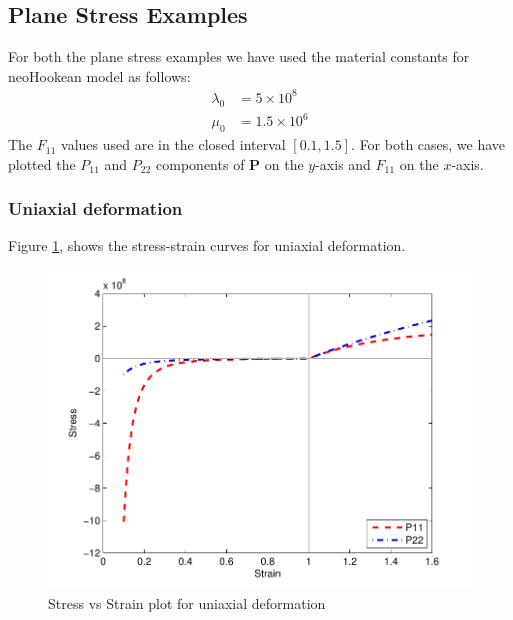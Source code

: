 \documentclass[../main.tex]{subfiles}
\begin{document}
\subsection{Plane Stress Examples}

For both the plane stress examples we have used the material constants for neoHookean model as follows:
\begin{align*}
  \lambda_0 &= 5\times10^8\\
  \mu_0 & = 1.5\times10^6
\end{align*}
The $F_{11}$ values used are in the closed interval $[0.1,1.5]$. For both cases, we have plotted the $P_{11}$ and $P_{22}$ components of $\mathbf{P}$ on the $y$-axis and $F_{11}$ on the $x$-axis.

\subsubsection{Uniaxial deformation}
Figure \ref{fig:uniaxial}, shows the stress-strain curves for uniaxial deformation.
\begin{figure}[h]
  \centering
  \includegraphics{./img/Uniaxial_1.pdf}  
  \caption{Stress vs Strain plot for uniaxial deformation}
  \label{fig:uniaxial}
\end{figure}
\end{document}
